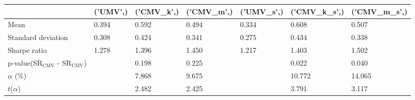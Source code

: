 \begin{tabular}{lllllll}
\toprule
 & ('UMV',) & ('CMV_k',) & ('CMV_m',) & ('UMV_s',) & ('CMV_k_s',) & ('CMV_m_s',) \\
\midrule
Mean & 0.394 & 0.592 & 0.494 & 0.334 & 0.608 & 0.507 \\
Standard deviation & 0.308 & 0.424 & 0.341 & 0.275 & 0.434 & 0.338 \\
Sharpe ratio & 1.278 & 1.396 & 1.450 & 1.217 & 1.403 & 1.502 \\
p-value(SR$_{\text{CMV}}$ - SR$_{\text{UMV}}$) &  & 0.198 & 0.225 &  & 0.022 & 0.040 \\
$\alpha$ (\%) &  & 7.868 & 9.675 &  & 10.772 & 14.065 \\
$t$($\alpha$) &  & 2.482 & 2.425 &  & 3.791 & 3.117 \\
\bottomrule
\end{tabular}
